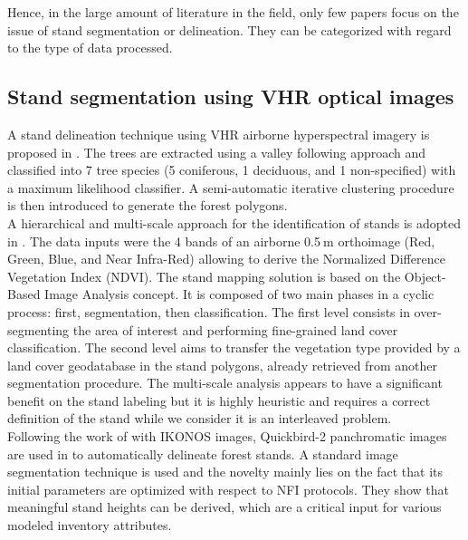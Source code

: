 Hence, in the large amount of literature in the field, only few papers focus on the issue of stand segmentation or delineation. They can be categorized with regard to the type of data processed. \\
\subsection{Stand segmentation using VHR optical images}
A stand delineation technique using VHR airborne hyperspectral imagery is proposed in \citep{leckie2003stand}. The trees are extracted using a valley following approach and classified into 7 tree species (5 coniferous, 1 deciduous, and 1 non-specified) with a maximum likelihood classifier. A semi-automatic iterative clustering procedure is then introduced to generate the forest polygons.\\

A hierarchical and multi-scale approach for the identification of stands is adopted in \citep{hernando2012spatial}. The data inputs were the 4 bands of an airborne 0.5$\:$m orthoimage (Red, Green, Blue, and Near Infra-Red) allowing to derive the Normalized Difference Vegetation Index (NDVI). The stand mapping solution is based on the Object-Based Image Analysis concept. It is composed of two main phases in a cyclic process: first, segmentation, then classification. The first level consists in over-segmenting the area of interest and performing fine-grained land cover classification. The second level aims to transfer the vegetation type provided by a land cover geodatabase in the stand polygons, already retrieved from another segmentation procedure. The multi-scale analysis appears to have a significant benefit on the stand labeling but it is highly heuristic and requires a correct definition of the stand while we consider it is an interleaved problem. \\

Following the work of \citep{Wulder2008} with IKONOS images, Quickbird-2 panchromatic images are used in \citep{Mora20102474} to automatically delineate forest stands. A standard image segmentation technique is used and the novelty mainly lies on the fact that its initial parameters are optimized with respect to NFI protocols. They show that meaningful stand heights can be derived, which are a critical input for various modeled inventory attributes.\\


